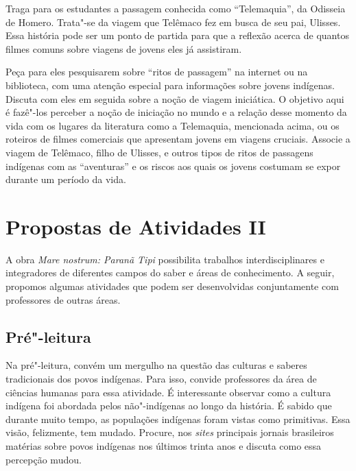 \documentclass[12pt]{extarticle}
\begin{document}
Traga para os estudantes a passagem conhecida como ``Telemaquia'', da Odisseia de Homero. Trata"-se da viagem que Telêmaco fez em busca de seu pai, Ulisses. Essa história pode ser um ponto de partida para que a reflexão acerca de quantos filmes comuns sobre viagens de jovens eles já assistiram.


Peça para eles pesquisarem sobre ``ritos de passagem''
na internet ou na biblioteca, com uma atenção especial para informações sobre jovens indígenas. Discuta com eles em seguida sobre a noção de viagem iniciática. O objetivo aqui é fazê"-los perceber a noção de iniciação no mundo e a relação desse momento da vida com os lugares da literatura como 
a Telemaquia, mencionada acima, ou os roteiros de filmes comerciais
que apresentam jovens em viagens cruciais. Associe a viagem de Telêmaco, filho de Ulisses, 
e outros tipos de ritos de passagens indígenas com as ``aventuras'' 
e os riscos aos quais os jovens costumam se expor durante um período da vida.

\section{Propostas de Atividades II}

A obra \emph{Mare nostrum: Paranã Tipi} possibilita trabalhos
interdisciplinares e integradores de diferentes campos do saber e áreas de conhecimento. A seguir, propomos algumas atividades que podem ser desenvolvidas conjuntamente com professores de outras áreas.


\subsection{Pré"-leitura}

Na pré"-leitura, convém um mergulho na questão das culturas e
saberes tradicionais dos povos indígenas. Para isso, convide professores da área de ciências humanas para essa atividade. É interessante observar como a cultura indígena foi abordada pelos não"-indígenas ao longo da história. É sabido que durante muito tempo, as populações indígenas foram vistas como primitivas. Essa visão, felizmente, tem mudado. Procure, 
nos \textit{sites} principais jornais brasileiros 
matérias sobre povos indígenas nos últimos trinta anos e discuta como
essa percepção mudou.
\end{document}
